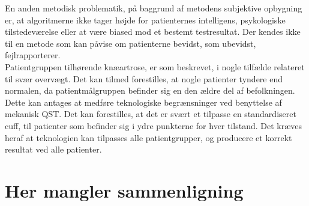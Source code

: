 En anden metodisk problematik, på baggrund af metodens subjektive opbygning er, at algoritmerne ikke tager højde for patienternes intelligens, psykologiske tilstedeværelse eller at være biased mod et bestemt testresultat. Der kendes ikke til en metode som kan påvise om patienterne bevidst, som ubevidst, fejlrapporterer. \citep{Dyck1998}  \\ 
Patientgruppen tilhørende knæartrose, er som beskrevet, i nogle tilfælde relateret til svær overvægt. Det kan tilmed forestilles, at nogle patienter tyndere end normalen, da patientmålgruppen befinder sig en den ældre del af befolkningen. Dette kan antages at medføre teknologiske begrænsninger ved benyttelse af mekanisk QST. Det kan forestilles, at det er svært et tilpasse en standardiseret cuff, til patienter som befinder sig i ydre punkterne for hver tilstand. Det kræves heraf at teknologien kan tilpasses alle patientgrupper, og producere et korrekt resultat ved alle patienter. 


\section{Her mangler sammenligning} 